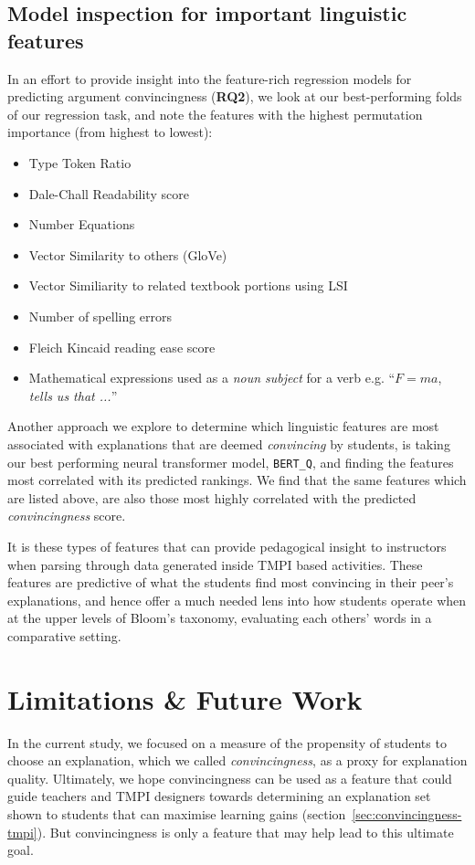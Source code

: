 \documentclass[notitlepage,12pt]{jedm}
\begin{document}
\subsection{Model inspection for important linguistic features}
In an effort to provide insight into the feature-rich regression models for predicting argument convincingness (\textbf{RQ2}), we look at our best-performing folds of our regression task, and note the features with the highest 
permutation importance (from highest to lowest):

\begin{itemize}
	\item Type Token Ratio
	\item Dale-Chall Readability score
	\item Number Equations
	\item Vector Similarity to others (GloVe)
	\item Vector Similiarity to related textbook portions using LSI
	\item Number of spelling errors
	\item Fleich Kincaid reading ease score
	\item Mathematical expressions used as a \textit{noun subject} for a verb  
	  e.g. ``$F=ma$, \textit{tells us that ...}''
\end{itemize}

Another approach we explore to determine which linguistic features are most 
associated with explanations that are deemed \textit{convincing} by students, 
is taking our best performing neural transformer model, \verb|BERT_Q|, and 
finding the features most correlated with its predicted rankings. 
We find that the same features which are listed above, are also those most highly 
correlated with the predicted \textit{convincingness} score.

It is these types of features that can provide pedagogical insight to 
instructors when parsing through data generated inside TMPI based activities.
These features are predictive of what the students find most convincing in 
their peer's explanations, and hence offer a much needed lens into how students 
operate when at the upper levels of Bloom's taxonomy, evaluating each others' 
words in a comparative setting.

\section{Limitations \& Future Work}

In the current study, we focused on a measure of the propensity of students to choose an
explanation, which we called \textit{convincingness}, as a proxy for explanation
quality. Ultimately, we hope convincingness can be used as a feature that could guide
teachers and TMPI designers towards determining an explanation set shown to students that can maximise learning gains (section~\ref{sec:convincingness-tmpi}).  But convincingness
is only a feature that may help lead to this ultimate goal.
\end{document}
